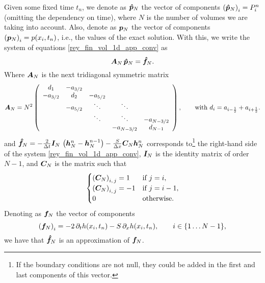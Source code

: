 Given some fixed time $t_n$, we denote as $\boldsymbol{\hat{p}}_N$ the vector of components $\left(\boldsymbol{\hat{p}}_N\right)_i=P_i^n$ (omitting the dependency on time), where $N$ is the number of volumes we are taking into account. Also, denote as $\boldsymbol{p}_N$ the vector of components $\left(\boldsymbol{p}_N\right)_i=p(x_i,t_n)$, i.e., the values of the exact solution. With this, we write the system of equations \eqref*{rey_fin_vol_1d_app_conv} as
\begin{equation}
\bds{A}_N\,\bds{\hat{p}}_N=\bds{\hat{f}}_N.\label{eq:rey_fin_vol_1d_system}
\end{equation}
Where $\boldsymbol{A}_N$ is the next tridiagonal symmetric matrix
\begin{equation}
\bds{A}_N=N^2\left(\begin{array}{ccccc}
d_1 & -a_{3/2} & {} & {} & {}\\
-a_{3/2} & d_2 & -a_{5/2} & {} & {}\\
{} & -a_{5/2} & \ddots & \ddots & {} \\
{} & {} & \ddots & \ddots & -a_{N-3/2} \\
{} & {} & {} & -a_{N-3/2} & d_{N-1} 
\end{array}\right),\qquad\text{with }d_i=a_{i-\frac{1}{2}}+a_{i+\frac{1}{2}}.\label{eq:AN_reynolds}
\end{equation}
and $\boldsymbol{\hat{f}}_N=-\frac{2}{\Delta t}\boldsymbol{I}_N\,\left(\boldsymbol{h}^n_N-\boldsymbol{h}^{n-1}_{N}\right)-\frac{S}{\Delta x}\boldsymbol{C}_N \boldsymbol{h}_N^n$ corresponds to\footnote{If the boundary conditions are not null, they could be added in the first and last components of this vector.} the right-hand side of the system \eqref*{rey_fin_vol_1d_app_conv}, $\boldsymbol{I}_N$ is the identity matrix of order $N-1$, and $\boldsymbol{C}_N$ is the matrix such that
\begin{equation*}
\begin{cases}
\left(\boldsymbol{C}_N\right)_{i,\,j}=1 & \text{if }j=i,\\ 
\left(\boldsymbol{C}_N\right)_{i,\,j}=-1 & \text{if }j=i-1,\\
0 & \text{otherwise.}
\end{cases}
\end{equation*} 
Denoting as $\boldsymbol{f}_N$ the vector of components 
\begin{equation}
\left(\bds{f}_N\right)_i=-2\,\partial _t h(x_i,t_n)-S\,\partial_x h(x_i,t_n),\qquad i\in\{1\ldots N-1\},\label{eq:FN_reynolds}
\end{equation}
we have that $\boldsymbol{\hat{f}}_N$ is an approximation of $\boldsymbol{f}_N$. 

